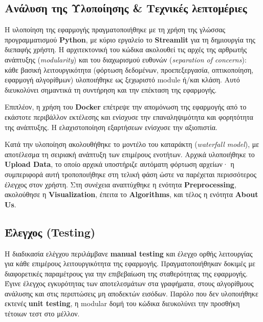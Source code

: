 \documentclass{article}  %
\begin{document}
\subsection{Ανάλυση της Υλοποίησης \& Τεχνικές λεπτομέριες}
\label{sec:implementation}

Η υλοποίηση της εφαρμογής πραγματοποιήθηκε με τη χρήση της γλώσσας προγραμματισμού \textbf{Python}, με κύριο εργαλείο το \textbf{Streamlit} για τη δημιουργία της διεπαφής χρήστη. Η αρχιτεκτονική του κώδικα ακολουθεί τις αρχές της αρθρωτής ανάπτυξης (\textit{modularity}) και του διαχωρισμού ευθυνών (\textit{separation of concerns}): κάθε βασική λειτουργικότητα (φόρτωση δεδομένων, προεπεξεργασία, οπτικοποίηση, εφαρμογή αλγορίθμων) υλοποιήθηκε ως ξεχωριστό module ή/και κλάση. Αυτό διευκολύνει σημαντικά τη συντήρηση και την επέκταση της εφαρμογής.

Επιπλέον, η χρήση του \textbf{Docker} επέτρεψε την απομόνωση της εφαρμογής από το εκάστοτε περιβάλλον εκτέλεσης και ενίσχυσε την επαναληψιμότητα και φορητότητα της ανάπτυξης. Η ελαχιστοποίηση εξαρτήσεων ενίσχυσε την αξιοπιστία.

Κατά την υλοποίηση ακολουθήθηκε το μοντέλο του καταράκτη (\textit{waterfall model}), με αποτέλεσμα τη σειριακή ανάπτυξη των επιμέρους ενοτήτων. Αρχικά υλοποιήθηκε το \textbf{Upload Data}, το οποίο αρχικά υποστήριζε αυτόματη φόρτωση αρχείων· η συμπεριφορά αυτή τροποποιήθηκε στη τελική φάση ώστε να παρέχεται περισσότερος έλεγχος στον χρήστη. Στη συνέχεια αναπτύχθηκε η ενότητα \textbf{Preprocessing}, ακολούθησε η \textbf{Visualization}, έπειτα το \textbf{Algorithms}, και τέλος η ενότητα \textbf{About Us}.




\subsection{Έλεγχος (Testing)}
\label{sec:testing}
Η διαδικασία ελέγχου περιλάμβανε \textbf{manual testing} και έλεγχο ορθής λειτουργίας για κάθε επιμέρους λειτουργικότητα της εφαρμογής. Πραγματοποιήθηκαν δοκιμές με διαφορετικές παραμέτρους για την επιβεβαίωση της σταθερότητας της εφαρμογής. Έγινε έλεγχος εγκυρότητας των αποτελεσμάτων στα γραφήματα, στους αλγορίθμους ανάλυσης και στις περιπτώσεις μη αποδεκτών εισόδων.
Παρόλο που δεν υλοποιήθηκε εκτενές \textbf{unit testing}, η modular δομή του κώδικα διευκολύνει την προσθήκη τέτοιων τεστ στο μέλλον.


\end{document}
